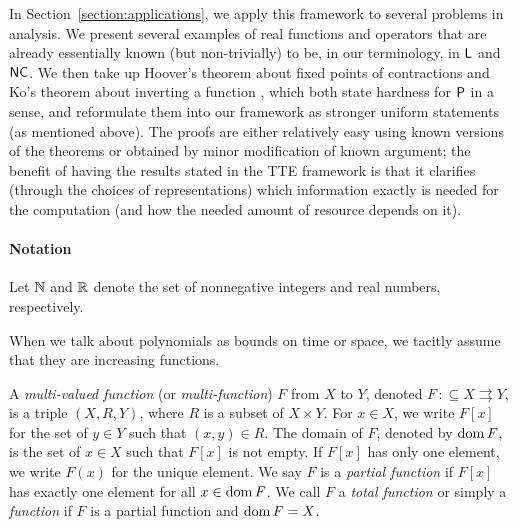 \documentclass[a4paper,UKenglish]{lipics}
\newcommand{\pcolon}{\mathpunct{\,:\subseteq}}
\begin{document}
In Section~\ref{section:applications}, 
we apply this framework to several problems in analysis.
We present several examples of real functions and operators 
that are already essentially known (but non-trivially) to be, 
in our terminology, 
in $\mathsf{L}$ and $\mathsf{NC}$. 
We then take up
Hoover's theorem about fixed points of contractions \cite{hoover1991real}
and Ko's theorem about inverting a function \cite{ko1991complexity}, 
which both state hardness for $\mathsf{P}$ in a sense, 
and reformulate them into our framework
as stronger uniform statements (as mentioned above).
The proofs are either relatively easy using known versions of the theorems
or obtained by minor modification of known argument; 
the benefit of having the results stated in the TTE framework 
is that it clarifies (through the choices of representations) 
which information exactly is needed for the computation 
(and how the needed amount of resource depends on it). 



\paragraph*{Notation}
Let $\mathbb N$ and $\mathbb R$ denote the set of nonnegative integers and 
real numbers, respectively.

When we talk about polynomials as bounds on time or space, 
we tacitly assume that they are increasing functions. 

A {\em multi-valued function} (or {\em multi-function}) $F$ from $X$ to $Y$,
denoted $F \pcolon X \rightrightarrows Y$,
is a triple $(X, R, Y)$, where $R$ is a subset of $X \times Y$.
For $x \in X$, we write $F[x]$ for the set of $y \in Y$ such that $(x,y) \in R$.
The domain of $F$, denoted by $\mathop{\rm dom} F$, is the set of $x \in X$ such that 
$F[x]$ is not empty.
If $F[x]$ has only one element, we write $F(x)$ for the unique element.
We say $F$ is a {\em partial function} if $F[x]$ has exactly one element for all
$x \in \mathop{\rm dom} F$.
We call $F$ a {\em total function} or simply a {\em function} 
if $F$ is a partial function and $\mathop{\rm dom} F = X$.
\end{document}
